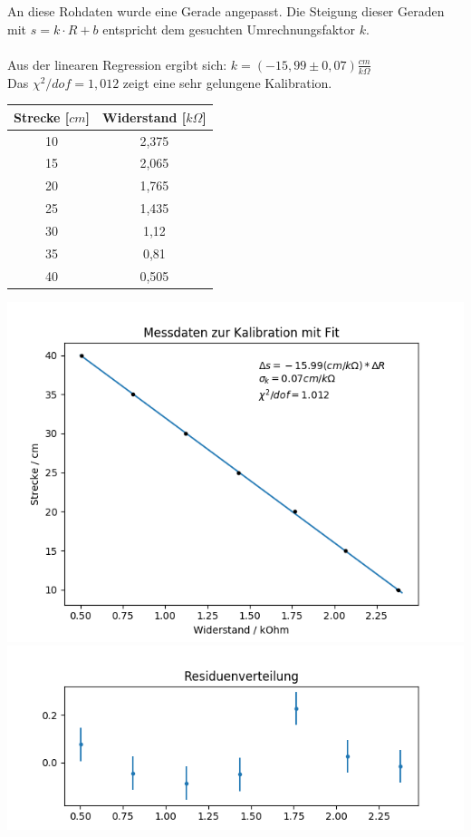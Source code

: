 \documentclass[12pt,a4paper]{article}
\begin{document}
	An diese Rohdaten wurde eine Gerade angepasst. Die Steigung dieser Geraden mit $s=k\cdot R+b$ entspricht dem gesuchten Umrechnungsfaktor $k$.\\\\
	Aus der linearen Regression ergibt sich: $ k = (-15,99 \pm 0,07) \frac{cm}{k\Omega}$\\
	Das $\chi^2/dof = 1,012$ zeigt eine sehr gelungene Kalibration.
	\begin{center}
        \begin{tabular}{|c|c|}
        	\hline
	        \textbf{Strecke [$cm$]} & \textbf{Widerstand [$k\Omega$]} \\
	        \hline
	        10 & 2,375 \\
			\hline
			15 & 2,065 \\
			\hline
			20 & 1,765 \\
			\hline
			25 & 1,435 \\
			\hline
			30 & 1,12 \\
			\hline
			35 & 0,81 \\
			\hline
			40 & 0,505 \\
			\hline		
		\end{tabular}
	\end{center}
	\begin{center}
		\includegraphics[width=0.7\linewidth]{kalibration_poti_fit}
		\includegraphics[width=0.7\linewidth]{residuen_kalibration}
	\end{center}
		
\end{document}
